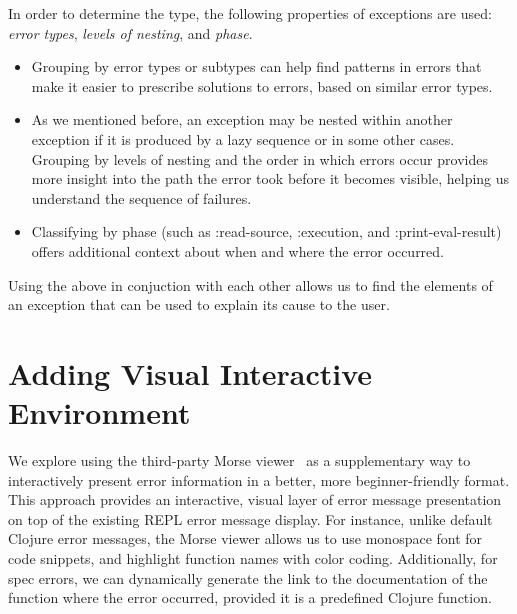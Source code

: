 \documentclass[12pt]{article}
\newcommand{\comment}[1]{}
\newcommand{\tkcomment}[1]{\textcolor{Teal}{\comment{Tristan: {#1}}}}
\begin{document}
In order to determine the type, the following properties of exceptions are used: \textit{error types}, \textit{levels of nesting}, and \textit{phase}.
\begin{itemize}
	\item Grouping by error types or subtypes can help find patterns in errors that make it easier to prescribe solutions to errors, based on similar error types.
	\item As we mentioned before, an exception may be nested within another exception if it is produced by a lazy sequence or in some other cases. Grouping by levels of nesting and the order in which errors occur provides more insight into the path the error took before it becomes visible, helping us understand the sequence of failures.
	\item Classifying by phase (such as :read-source, :execution, and :print-eval-result) offers additional context about when and where the error occurred.
\end{itemize}
Using the above in conjuction with each other allows us to find the elements of an exception that can be used to explain its cause to the user. 

%
%
%
%

\section{Adding Visual Interactive Environment}\label{sec:interactive}

We explore using the third-party Morse viewer~\cite{morse} as a supplementary way to interactively present error information in a better, more beginner-friendly format.
This approach provides an interactive, visual layer of error message presentation on top of the existing REPL error message display.
For instance, unlike default Clojure error messages, the Morse viewer allows us to use monospace font for code snippets, and highlight function names with color coding. 
Additionally, for spec errors, we can dynamically generate the link to the documentation of the function where the error occurred, provided it is a predefined Clojure function.
\end{document}
